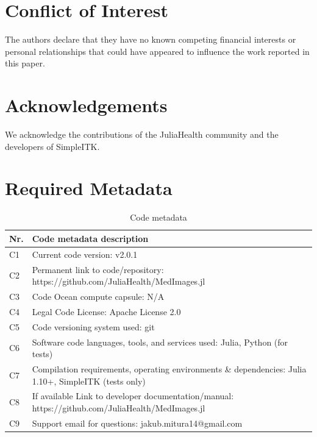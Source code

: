 \documentclass[a4paper,10pt]{elsarticle}
\begin{document}
  \section*{Conflict of Interest}
  The authors declare that they have no known competing financial interests or personal relationships that could have appeared to influence the work reported in this paper.

  \section*{Acknowledgements}
  We acknowledge the contributions of the JuliaHealth community and the developers of SimpleITK.

  

  \section*{Required Metadata}
  \label{sec:metadata}

  \begin{table}[H]
  \begin{tabular}{|l|p{11.5cm}|}
  \hline
  \textbf{Nr.} & \textbf{Code metadata description} \\
  \hline
  C1 & Current code version: v2.0.1 \\
  \hline
  C2 & Permanent link to code/repository: https://github.com/JuliaHealth/MedImages.jl \\
  \hline
  C3 & Code Ocean compute capsule: N/A \\
  \hline
  C4 & Legal Code License: Apache License 2.0 \\
  \hline
  C5 & Code versioning system used: git \\
  \hline
  C6 & Software code languages, tools, and services used: Julia, Python (for tests) \\
  \hline
  C7 & Compilation requirements, operating environments \& dependencies: Julia 1.10+, SimpleITK (tests only) \\
  \hline
  C8 & If available Link to developer documentation/manual: https://github.com/JuliaHealth/MedImages.jl \\
  \hline
  C9 & Support email for questions: jakub.mitura14@gmail.com\\
  \hline
  \end{tabular}
  \caption{Code metadata}
  \end{table}

  
\end{document}
